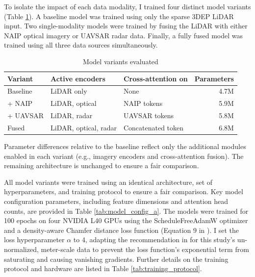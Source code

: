 \documentclass[12pt]{report}
\begin{document}
To isolate the impact of each data modality, I trained four distinct model variants (Table \ref{tab:model_variants}). A baseline model was trained using only the sparse 3DEP LiDAR input. Two single-modality models were trained by fusing the LiDAR with either NAIP optical imagery or UAVSAR radar data. Finally, a fully fused model was trained using all three data sources simultaneously.
\begin{table}[htbp]
  \centering
  \begin{threeparttable}
  \caption{Model variants evaluated}
  \label{tab:model_variants}
  \begin{tabular}{lllr}
  \toprule
  \textbf{Variant} & \textbf{Active encoders} & \textbf{Cross-attention on} & \textbf{Parameters} \\
  \midrule
 Baseline & LiDAR only & None  & 4.7M \\
  + NAIP & LiDAR, optical  & NAIP tokens & 5.9M \\
  + UAVSAR & LiDAR, radar & UAVSAR tokens  & 5.8M \\
  Fused  & LiDAR, optical, radar & Concatenated token  & 6.8M \\
  \bottomrule
  \end{tabular}
  \begin{tablenotes}
  \footnotesize
  \item Parameter differences relative to the baseline reflect only the additional modules enabled in each variant (e.g., imagery encoders and cross-attention fusion). The remaining architecture is unchanged to ensure a fair comparison.
  \end{tablenotes}
  \end{threeparttable}
\end{table}


\vspace{-3pt}
All model variants were trained using an identical architecture, set of hyperparameters, and training protocol to ensure a fair comparison. Key model configuration parameters, including feature dimensions and attention head counts, are provided in Table \ref{tab:model_config_a}. The models were trained for 100 epochs on four NVIDIA L40 GPUs using the ScheduleFreeAdamW optimizer \citep{defazio_road_2024} and a density-aware Chamfer distance loss function (Equation 9 in \citep{wu_density-aware_2021}). I set the loss hyperparameter $\alpha$ to 4, adapting the recommendation in \citep{wu_density-aware_2021} for this study's un-normalized, meter-scale data to prevent the loss function's exponential term from saturating and causing vanishing gradients. Further details on the training protocol and hardware are listed in Table \ref{tab:training_protocol}.
\end{document}
